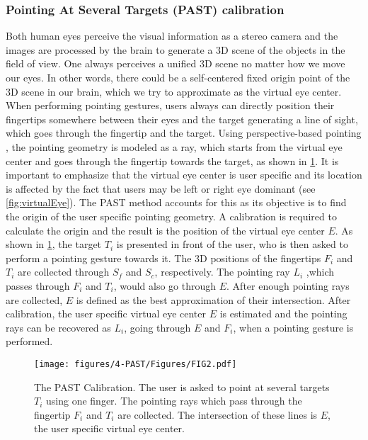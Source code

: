 \subsubsection{Pointing At Several Targets (PAST) calibration} \label{sec:4:PAST}
Both human eyes perceive the visual information as a stereo camera and the images are processed by the brain to generate a 3D scene of the objects in the field of view. One always perceives a unified 3D scene no matter how we move our eyes. In other words, there could be a self-centered fixed origin point of the 3D scene in our brain, which we try to approximate as the virtual eye center. When performing pointing gestures, users always can directly position their fingertips somewhere between their eyes and the target generating a line of sight, which goes through the fingertip and the target. Using perspective-based pointing  \citep{Pierce1997},  the pointing geometry is modeled as a ray, which starts from the virtual eye center and goes through the fingertip towards the target, as shown in \figurename{ \ref{fig:calibration}}. It is important to emphasize that the virtual eye center is user specific and its location is affected by the fact that users may be left or right eye dominant (see \figurename{ \ref{fig:virtualEye}}).
The PAST method accounts for this as its objective is to find the origin of the user specific pointing geometry. 
A calibration is required to calculate the origin and the result is the position of the virtual eye center $E$. 
As shown in \figurename{ \ref{fig:calibration}}, the target $T_i$ is presented in front of the user, who is then asked to perform a pointing gesture towards it. The 3D positions of the fingertips $F_i$ and $T_i$ are collected through $S_f$ and $S_c$, respectively. The pointing ray $L_i$ ,which passes through $F_i$ and $T_i$, would also go through $E$. After enough pointing rays are collected, $E$ is defined as the best approximation of their intersection. After calibration, the user specific virtual eye center $E$ is estimated and the pointing rays can be recovered as $L_{i}$, going through $E$ and  $F_i$, when a pointing gesture is performed.
\begin{figure} 
	\centering
	\texttt{[image: figures/4-PAST/Figures/FIG2.pdf]}
	\caption{The PAST Calibration. The user is asked to point at several targets $T_i$ using one finger. The pointing rays which pass through the fingertip $F_i$ and $T_i$ are collected. The intersection of these lines is $E$, the user specific virtual eye center.}
	\label{fig:calibration}
\end{figure}
